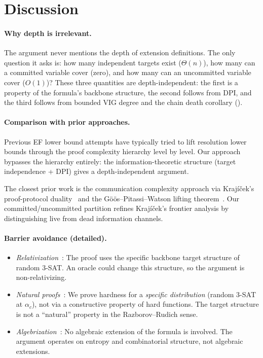 \documentclass[11pt]{article}
\theoremstyle{definition}
\begin{document}
\section{Discussion}\label{sec:discussion}

\paragraph{Why depth is irrelevant.}
The argument never mentions the depth of extension definitions.
The only question it asks is: how many independent targets exist
($\Theta(n)$), how many can a committed variable cover (zero), and
how many can an uncommitted variable cover ($O(1)$)?  These three
quantities are depth-independent: the first is a property of the
formula's backbone structure, the second follows from DPI, and the third follows
from bounded VIG degree and the chain death corollary
().

\paragraph{Comparison with prior approaches.}
Previous EF lower bound attempts have typically tried to lift resolution
lower bounds through the proof complexity hierarchy level by level.  Our
approach bypasses the hierarchy entirely: the information-theoretic
structure (target independence + DPI) gives a
depth-independent argument.

The closest prior work is the communication complexity approach via
Kraj\'i\v{c}ek's proof-protocol duality~\cite{Krajicek1995} and the
G\"o\"os--Pitassi--Watson lifting theorem~\cite{Goos2015}.  Our
committed/uncommitted partition refines Kraj\'i\v{c}ek's frontier
analysis by distinguishing live from dead information channels.

\paragraph{Barrier avoidance (detailed).}
\begin{itemize}
\item \emph{Relativization}~\cite{Baker1975}: The proof uses the
specific backbone target structure of random 3-SAT.  An oracle could
change this structure, so the argument is non-relativizing.
\item \emph{Natural proofs}~\cite{RazborovRudich1997}: We prove
hardness for a \emph{specific distribution} (random 3-SAT at
$\alpha_c$), not via a constructive property of hard functions.  The
target structure is not a ``natural'' property in the Razborov--Rudich
sense.
\item \emph{Algebrization}~\cite{AaronsonWigderson2009}: No algebraic
extension of the formula is involved.  The argument operates on
entropy and combinatorial structure, not algebraic extensions.
\end{itemize}
\end{document}
